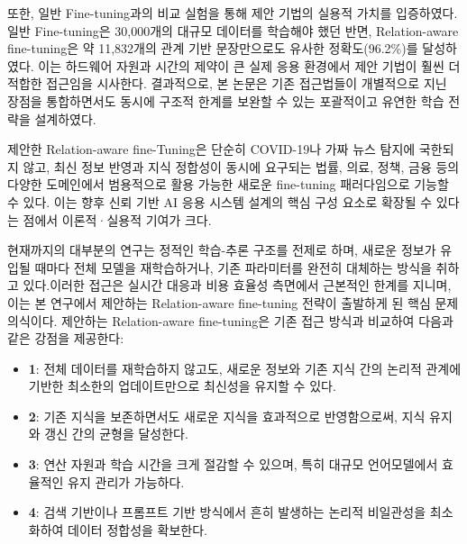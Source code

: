 \documentclass[a4paper,fleqn]{cas-sc}
\begin{document}
또한, 일반 Fine-tuning과의 비교 실험을 통해 제안 기법의 실용적 가치를 입증하였다. 일반 Fine-tuning은 30,000개의 대규모 데이터를 학습해야 했던 반면, Relation-aware fine-tuning은 약 11,832개의 관계 기반 문장만으로도 유사한 정확도(96.2\%)를 달성하였다. 이는 하드웨어 자원과 시간의 제약이 큰 실제 응용 환경에서 제안 기법이 훨씬 더 적합한 접근임을 시사한다.
결과적으로, 본 논문은 기존 접근법들이 개별적으로 지닌 장점을 통합하면서도 동시에 구조적 한계를 보완할 수 있는 포괄적이고 유연한 학습 전략을 설계하였다. 

제안한 Relation-aware fine-Tuning은 단순히 COVID-19나 가짜 뉴스 탐지에 국한되지 않고, 최신 정보 반영과 지식 정합성이 동시에 요구되는 법률, 의료, 정책, 금융 등의 다양한 도메인에서 범용적으로 활용 가능한 새로운 fine-tuning 패러다임으로 기능할 수 있다. 이는 향후 신뢰 기반 AI 응용 시스템 설계의 핵심 구성 요소로 확장될 수 있다는 점에서 이론적·실용적 기여가 크다.


현재까지의 대부분의 연구는 정적인 학습-추론 구조를 전제로 하며, 새로운 정보가 유입될 때마다 전체 모델을 재학습하거나, 기존 파라미터를 완전히 대체하는 방식을 취하고 있다.이러한 접근은 실시간 대응과 비용 효율성 측면에서 근본적인 한계를 지니며, 이는 본 연구에서 제안하는 Relation-aware fine-tuning 전략이 출발하게 된 핵심 문제의식이다.
제안하는 Relation-aware fine-tuning은 기존 접근 방식과 비교하여 다음과 같은 강점을 제공한다:
\begin{itemize}
	\item{\textbf{1}:
	전체 데이터를 재학습하지 않고도, 새로운 정보와 기존 지식 간의 논리적 관계에 기반한 최소한의 업데이트만으로 최신성을 유지할 수 있다.}

	\item{\textbf{2}:
	기존 지식을 보존하면서도 새로운 지식을 효과적으로 반영함으로써, 지식 유지와 갱신 간의 균형을 달성한다.}

	\item{\textbf{3}:
	연산 자원과 학습 시간을 크게 절감할 수 있으며, 특히 대규모 언어모델에서 효율적인 유지 관리가 가능하다.}

	\item{\textbf{4}:
	검색 기반이나 프롬프트 기반 방식에서 흔히 발생하는 논리적 비일관성을 최소화하여 데이터 정합성을 확보한다.}
\end{itemize}
\end{document}

